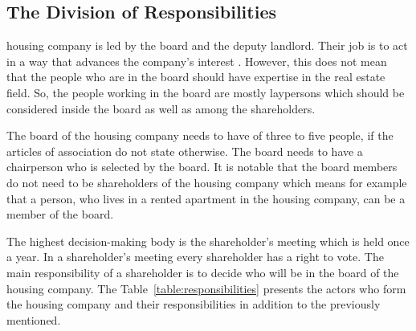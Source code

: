 \subsection{The Division of Responsibilities}

housing company is led by the board and the deputy landlord. Their job is to act in a way that advances the company's interest \parencite{LLHA:2}. However, this does not mean that the people who are in the board should have expertise in the real estate field. So, the people working in the board are mostly laypersons which should be considered inside the board as well as among the shareholders. \parencite{Hallintotapa:2017}

The board of the housing company needs to have of three to five people, if the articles of association do not state otherwise. The board needs to have a chairperson who is selected by the board. It is notable that the board members do not need to be shareholders of the housing company which means for example that a person, who lives in a rented apartment in the housing company, can be a member of the board. \parencite{Kotitalolehti:2012}

The highest decision-making body is the shareholder's meeting which is held once a year. In a shareholder's meeting every shareholder has a right to vote. The main responsibility of a shareholder is to decide who will be in the board of the housing company. The Table~\ref{table:responsibilities} presents the actors who form the housing company and their responsibilities in addition to the previously mentioned. \parencite{RantanenViiala:2015} 

